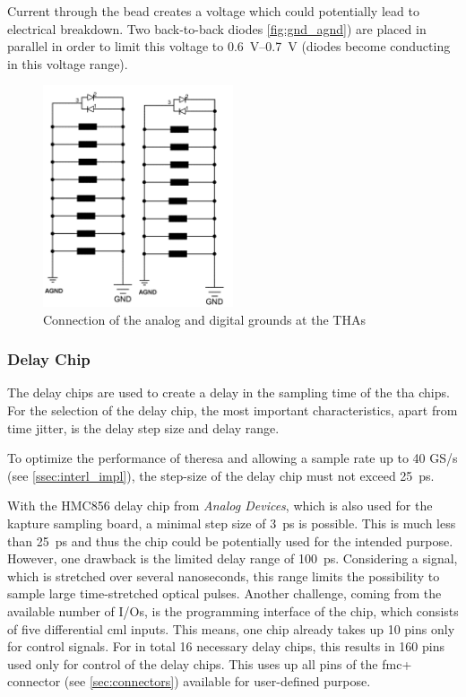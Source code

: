 Current through the bead creates a voltage which could potentially lead to electrical breakdown. 
Two back-to-back diodes \autoref{fig:gnd_agnd}) are placed in parallel in order to limit this voltage to \SIrange{0.6}{0.7}{\volt} (diodes become conducting in this voltage range).

\begin{figure}[tbh]
	\centering
	\includegraphics[width = 0.5\textwidth]{chap/04-work/img/gnd_agnd}
	\caption{Connection of the analog and digital grounds at the THAs}
	\label{fig:gnd_agnd}
\end{figure}

\subsubsection*{Delay Chip}
The delay chips are used to create a delay in the sampling time of the \gls{tha} chips. For the selection of the delay chip, the most important characteristics, apart from time jitter, is the delay step size and delay range. 

To optimize the performance of \gls{theresa} and allowing a sample rate up to 40 GS/s (see \autoref{ssec:interl_impl}), the step-size of the delay chip must not exceed \SI{25}{\pico \second}.

With the HMC856 delay chip from \textit{Analog Devices}, which is also used for the \gls{kapture} sampling board, a minimal step size of \SI{3}{\pico\second} \cite{hmc856} is possible.
This is much less than  \SI{25}{\pico \second} and thus the chip could be potentially used for the intended purpose.
However, one drawback is the limited delay range of \SI{100}{\pico\second}.
Considering a signal, which is stretched over several nanoseconds, this range limits the possibility to sample large time-stretched optical pulses.
Another challenge, coming from the available number of I/Os, is the programming interface of the chip, which consists of five differential \gls{cml} inputs.
This means, one chip already takes up 10 pins only for control signals.
For in total 16 necessary delay chips, this results in 160 pins used only for control of the delay chips.
This uses up all pins of the \gls{fmc}+ connector (see \autoref{sec:connectors}) available for user-defined purpose. 

